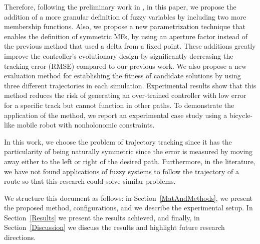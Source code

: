 \documentclass[symmetry,article,submit,moreauthors,pdftex]{Definitions/mdpi}
\begin{document}
Therefore, following the preliminary work in
\cite{mancilla2022tracking,Mancilla2021}, in this paper, we propose the
addition of a more granular definition of fuzzy variables by including two more
membership functions. Also, we propose a new parametrization technique that
enables the definition of symmetric MFs, by using an aperture factor instead of
the previous method that used a delta from a fixed point.  These additions
greatly improve the controller's evolutionary design by significantly
decreasing the tracking error (RMSE) compared to our previous work. We also
propose a new evaluation method for establishing the fitness of candidate
solutions by using three different trajectories in each simulation.
Experimental results show that this method reduces the risk of generating an
over-trained controller with low error for a specific track but cannot function
in other paths. To demonstrate the application of the method, we report an
experimental case study using a bicycle-like mobile robot with nonholonomic
constraints. 

In this work, we choose the problem of trajectory tracking since it has the
particularity of being naturally symmetric since the error is measured by
moving away either to the left or right of the desired path. Furthermore, in
the literature, we have not found applications of fuzzy systems to follow the
trajectory of a route so that this research could solve similar problems.

We structure this document as follows: in Section~\ref{MatAndMethods}, we
present the proposed method, configurations, and we describe the experimental
setup. In Section~\ref{Results} we present the results achieved, and finally,
in Section~\ref{Discussion} we discuss the results and highlight future
research directions.

 
\end{document}
